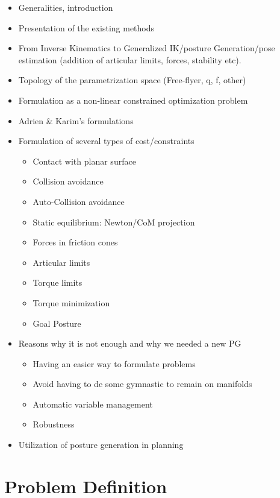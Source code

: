 \begin{itemize}
  \item Generalities, introduction
  \item Presentation of the existing methods
  \item From Inverse Kinematics to Generalized IK/posture Generation/pose estimation (addition of articular limits, forces, stability etc).
  \item Topology of the parametrization space (Free-flyer, q, f, other)
  \item Formulation as a non-linear constrained optimization problem
  \item Adrien \& Karim's formulations
  \item Formulation of several types of cost/constraints
  \begin{itemize}
    \item Contact with planar surface
    \item Collision avoidance
    \item Auto-Collision avoidance
    \item Static equilibrium: Newton/CoM projection
    \item Forces in friction cones
    \item Articular limits
    \item Torque limits
    \item Torque minimization
    \item Goal Posture
  \end{itemize}
  \item Reasons why it is not enough and why we needed a new PG
    \begin{itemize}
      \item Having an easier way to formulate problems
      \item Avoid having to de some gymnastic to remain on manifolds
      \item Automatic variable management
      \item Robustness
    \end{itemize}
  \item Utilization of posture generation in planning
\end{itemize}


\section{Problem Definition}
\label{sec:problem_definition}


